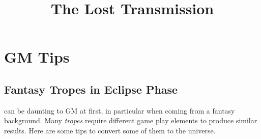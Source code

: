 \documentclass[a4]{article}
\begin{document}
\title{The Lost Transmission}






\section{GM Tips}

\subsection{Fantasy Tropes in Eclipse Phase}

\eclipsephase can be daunting to GM at first, in particular when coming from a fantasy background.
%
Many \textit{tropes} require different game play elements to produce similar results.
%
Here are some tips to convert some of them to the \eclipsephase universe. \\
\end{document}
